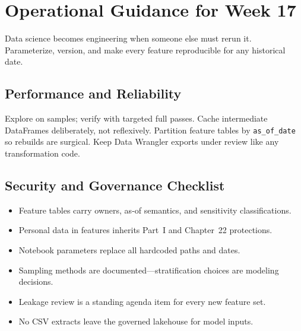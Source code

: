 \section{Operational Guidance for Week 17}
Data science becomes engineering when someone else must rerun it. Parameterize, version, and make every feature reproducible for any historical date.

\subsection{Performance and Reliability}
Explore on samples; verify with targeted full passes. Cache intermediate DataFrames deliberately, not reflexively. Partition feature tables by \texttt{as\_of\_date} so rebuilds are surgical. Keep Data Wrangler exports under review like any transformation code.

\subsection{Security and Governance Checklist}
\begin{itemize}
    \item Feature tables carry owners, as-of semantics, and sensitivity classifications.
    \item Personal data in features inherits Part~I and Chapter~22 protections.
    \item Notebook parameters replace all hardcoded paths and dates.
    \item Sampling methods are documented---stratification choices are modeling decisions.
    \item Leakage review is a standing agenda item for every new feature set.
    \item No CSV extracts leave the governed lakehouse for model inputs.
\end{itemize}

